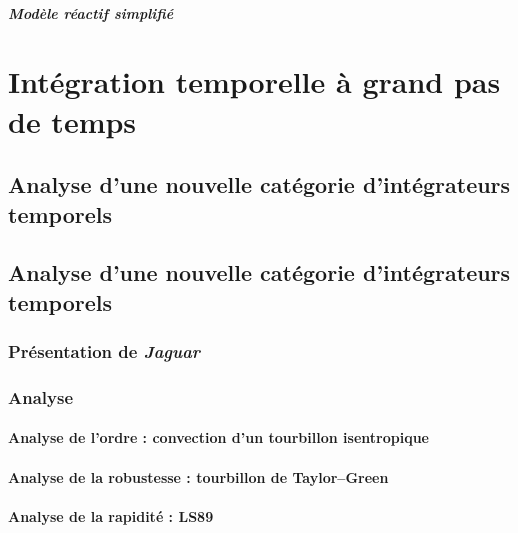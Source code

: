       \subsubsection{Modèle réactif simplifié}


\part{Intégration temporelle à grand pas de temps}


\chapter{Analyse d’une nouvelle catégorie d’intégrateurs temporels}

\chapter{Analyse d’une nouvelle catégorie d’intégrateurs temporels}
  \section{Présentation de \emph{Jaguar}}
  \section{Analyse}
    \subsection{Analyse de l'ordre : convection d'un tourbillon isentropique}
    \subsection{Analyse de la robustesse : tourbillon de Taylor--Green}
    \subsection{Analyse de la rapidité : LS89}








\pagebreak




